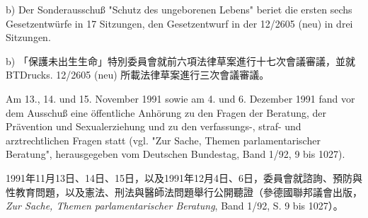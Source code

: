 \documentclass[12pt]{article}
\begin{document}
\begin{sourcepara}[title={原文理由 A.II.2.b--c}]
b) Der Sonderausschuß "Schutz des ungeborenen Lebens" beriet die ersten sechs Gesetzentwürfe in 17 Sitzungen, den Gesetzentwurf in der \abbrBTDrucks{} 12/2605 (neu) in drei Sitzungen.
\end{sourcepara}
\begin{transpara}
b) 「保護未出生生命」特別委員會就前六項法律草案進行十七次會議審議，並就 BTDrucks. 12/2605 (neu) 所載法律草案進行三次會議審議。
\end{transpara}

\begin{sourcepara}[title={原文理由 A.II.2.b--c} Rn 43]
Am 13., 14. und 15. November 1991 sowie am 4. und 6. Dezember 1991 fand vor dem Ausschuß eine öffentliche Anhörung zu den Fragen der Beratung, der Prävention und Sexualerziehung und zu den verfassungs-, straf- und arztrechtlichen Fragen statt (vgl. "Zur Sache, Themen parlamentarischer Beratung", herausgegeben vom Deutschen Bundestag, Band 1/92, \abbrS{} 9 bis 1027).
\end{sourcepara}
\begin{transpara}
1991年11月13日、14日、15日，以及1991年12月4日、6日，委員會就諮詢、預防與性教育問題，以及憲法、刑法與醫師法問題舉行公開聽證（參德國聯邦議會出版，\textit{Zur Sache, Themen parlamentarischer Beratung}, Band 1/92, S. 9 bis 1027）。
\end{transpara}
\end{document}
